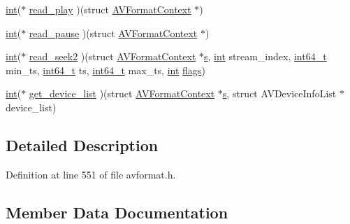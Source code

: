 \begin{DoxyCompactItemize}
\item 
\hyperlink{xmltok_8h_a5a0d4a5641ce434f1d23533f2b2e6653}{int}($\ast$ \hyperlink{struct_a_v_input_format_a4658ac53d7c6eaea445409010cd3b474}{read\+\_\+play} )(struct \hyperlink{struct_a_v_format_context}{A\+V\+Format\+Context} $\ast$)
\item 
\hyperlink{xmltok_8h_a5a0d4a5641ce434f1d23533f2b2e6653}{int}($\ast$ \hyperlink{struct_a_v_input_format_a4e4da186feab0a2900404e77aa3631f4}{read\+\_\+pause} )(struct \hyperlink{struct_a_v_format_context}{A\+V\+Format\+Context} $\ast$)
\item 
\hyperlink{xmltok_8h_a5a0d4a5641ce434f1d23533f2b2e6653}{int}($\ast$ \hyperlink{struct_a_v_input_format_abdc6865c444251c21980d8da2e087429}{read\+\_\+seek2} )(struct \hyperlink{struct_a_v_format_context}{A\+V\+Format\+Context} $\ast$\hyperlink{lib_2expat_8h_a755339d27872b13735c2cab829e47157}{s}, \hyperlink{xmltok_8h_a5a0d4a5641ce434f1d23533f2b2e6653}{int} stream\+\_\+index, \hyperlink{lib-src_2ffmpeg_2win32_2stdint_8h_a67a9885ef4908cb72ce26d75b694386c}{int64\+\_\+t} min\+\_\+ts, \hyperlink{lib-src_2ffmpeg_2win32_2stdint_8h_a67a9885ef4908cb72ce26d75b694386c}{int64\+\_\+t} ts, \hyperlink{lib-src_2ffmpeg_2win32_2stdint_8h_a67a9885ef4908cb72ce26d75b694386c}{int64\+\_\+t} max\+\_\+ts, \hyperlink{xmltok_8h_a5a0d4a5641ce434f1d23533f2b2e6653}{int} \hyperlink{struct_a_v_input_format_a1b30f6647d0c2faf38ba8786d7c3a838}{flags})
\item 
\hyperlink{xmltok_8h_a5a0d4a5641ce434f1d23533f2b2e6653}{int}($\ast$ \hyperlink{struct_a_v_input_format_a904104dc65359b800012d7abd01bb8e7}{get\+\_\+device\+\_\+list} )(struct \hyperlink{struct_a_v_format_context}{A\+V\+Format\+Context} $\ast$\hyperlink{lib_2expat_8h_a755339d27872b13735c2cab829e47157}{s}, struct A\+V\+Device\+Info\+List $\ast$device\+\_\+list)
\end{DoxyCompactItemize}


\subsection{Detailed Description}


Definition at line 551 of file avformat.\+h.



\subsection{Member Data Documentation}
